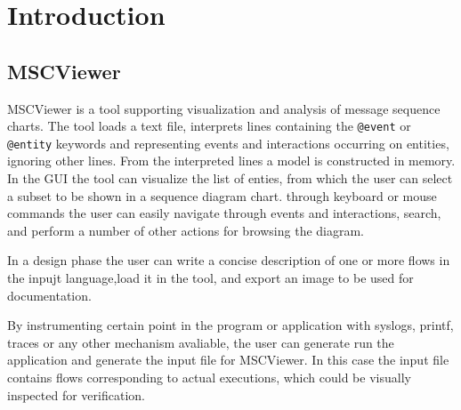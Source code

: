 \documentclass[11pt, twoside, titlepage]{book}
\date{\today}
\makeatletter
\newcommand{\prog}{MSCViewer}
\newcommand{\mscevent}{\texttt{@event}}
\newcommand{\mscentity}{\texttt{@entity}}
\makeatother
\begin{document}
\clearpage
\thispagestyle{empty}

 

\cleardoublepage

\setcounter{page}{1}


\chapter{Introduction}

\section{\prog}
\prog{} is a tool supporting visualization and analysis of message sequence
charts. The tool loads a text file, interprets lines containing the
\mscevent{} or \mscentity{} keywords and representing events and interactions occurring on
entities, ignoring other lines. From the interpreted lines a model is
constructed in memory. In the GUI the tool can visualize the list of enties,
from which the user can select a subset to be shown in a sequence diagram chart.
through keyboard or mouse commands the user can easily navigate through events
and interactions, search, and perform a number of other actions for browsing the
diagram.

In a design phase the user can write a concise description of one or
more flows in the inpujt language,load it in the tool, and export an image to 
be used for documentation.

By instrumenting certain point in the program or application with syslogs,
printf, traces or any other mechanism avaliable, the user can generate run the
application and generate the input file for \prog{}. In this case the input
file contains flows corresponding to actual executions, which could be visually
inspected for verification.
\end{document}
